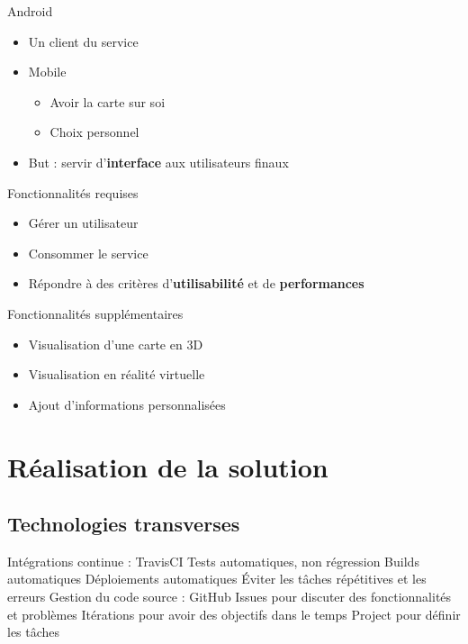\documentclass{beamer} %
\begin{document}
  \begin{frame}{\subsecname}
    \begin{block}{Android}
      \begin{itemize}
        \item Un client du service
        \item Mobile
        \begin{itemize}
          \item Avoir la carte sur soi
          \item Choix personnel
        \end{itemize}
        \item But : servir d'\textbf{interface} aux utilisateurs finaux
      \end{itemize}
    \end{block}

    \begin{alertblock}{Fonctionnalités requises}
      \begin{itemize}
        \item Gérer un utilisateur
        \item Consommer le service
        \item Répondre à des critères d'\textbf{utilisabilité} et de \textbf{performances}
      \end{itemize}
    \end{alertblock}

    \begin{exampleblock}{Fonctionnalités supplémentaires}
      \begin{itemize}
        \item Visualisation d'une carte en 3D
        \item Visualisation en réalité virtuelle
        \item Ajout d'informations personnalisées
      \end{itemize}
    \end{exampleblock}

  \end{frame}


  \section{Réalisation de la solution}
  \subsection{Technologies transverses}
  \begin{frame}{\subsecname}
    Intégrations continue :
    TravisCI
    Tests automatiques, non régression
    Builds automatiques
    Déploiements automatiques
    Éviter les tâches répétitives et les erreurs
    Gestion du code source :
    GitHub
    Issues pour discuter des fonctionnalités et problèmes
    Itérations pour avoir des objectifs dans le temps
    Project pour définir les tâches  
  \end{frame}
\end{document}
